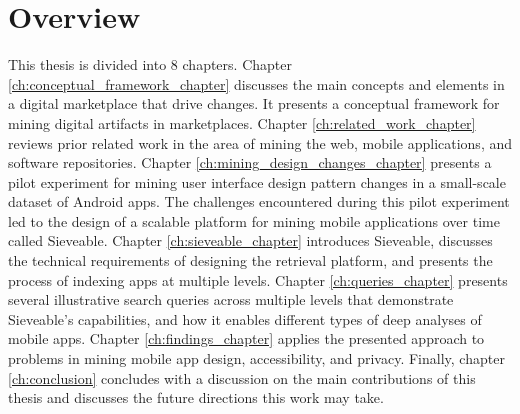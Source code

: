 \section{Overview}
This thesis is divided into 8 chapters.
Chapter \ref{ch:conceptual_framework_chapter} discusses the main concepts and elements in a digital marketplace that drive changes.
It presents a conceptual framework for mining digital artifacts in marketplaces.
Chapter \ref{ch:related_work_chapter} reviews prior related work in the area of mining the web, mobile applications, and software repositories.
Chapter \ref{ch:mining_design_changes_chapter} presents a pilot experiment for mining user interface design pattern changes in a small-scale dataset of Android apps.
The challenges encountered during this pilot experiment led to the design of a scalable platform for mining mobile applications over time called Sieveable.
Chapter \ref{ch:sieveable_chapter} introduces Sieveable, discusses the technical requirements of designing the retrieval platform, and presents the process of indexing apps at multiple levels.
Chapter \ref{ch:queries_chapter} presents several illustrative search queries across multiple levels that demonstrate Sieveable's capabilities, and how it enables different types of deep analyses of mobile apps.
Chapter \ref{ch:findings_chapter} applies the presented approach to problems in mining mobile app design, accessibility, and privacy.
Finally, chapter \ref{ch:conclusion} concludes with a discussion on the main contributions of this thesis and discusses the future directions this work may take.

